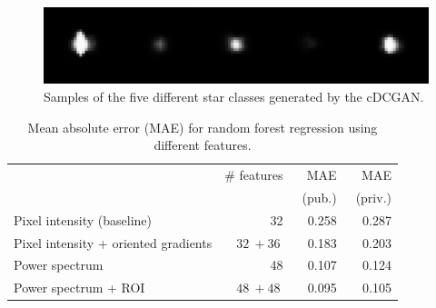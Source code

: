 \documentclass[10pt,conference,compsocconf]{IEEEtran}
\begin{document}
\begin{figure}
    \centering
    \includegraphics[width=\columnwidth]{assets/clustered_generated_stars_resized.png}
    \caption{Samples of the five different star classes generated by the cDCGAN.}
    \label{fig:clustered_generated_stars}
\end{figure}

\begin{table}\centering
    \begin{tabular}{lrrr}
    \toprule
        & \# features & MAE & MAE \\
        & & ~(pub.) & ~(priv.) \\
    \midrule
        Pixel intensity (baseline) & \SI{32}{} & \SI{0.258}{} & \SI{0.287}{}  \\
        Pixel intensity + oriented gradients & $\SI{32}{} + \SI{36}{}$ & \SI{0.183}{} & \SI{0.203}{} \\
        Power spectrum & \SI{48}{} & \SI{0.107}{} & \SI{0.124}{} \\
        Power spectrum + ROI & $\SI{48}{} + \SI{48}{}$ & \SI{0.095}{} & \SI{0.105}{} \\
    \bottomrule
    \end{tabular}
\caption{Mean absolute error (MAE) for random forest regression using different features.}
\label{tab:RF}
\end{table}
\end{document}
